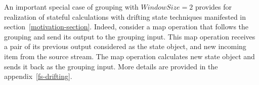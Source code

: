 




An important special case of grouping with $Window Size = 2$  provides for realization of stateful calculations with drifting state techniques manifested in section~\ref{motivation-section}.  
Indeed, consider a map operation that follows the grouping and send its output to the grouping input. This map operation receives a pair of its previous output considered as the state object, and new incoming item from the source stream. The map operation calculates new state object and sends it back as the grouping input. 
More details are provided in the appendix~\ref{fs-drifting}.



